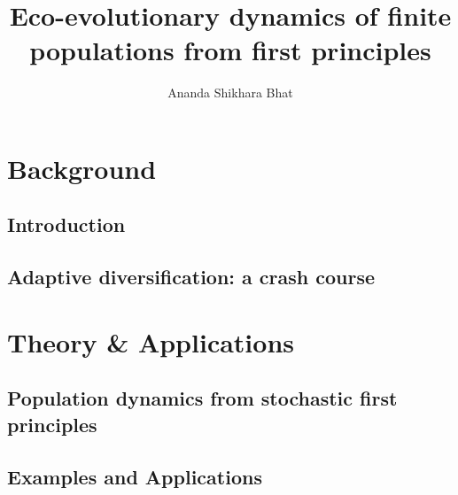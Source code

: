\documentclass[twoside, 12pt]{iiser-thesis}
\title{Eco-evolutionary dynamics of finite populations from first principles}
\author{Ananda Shikhara Bhat}
\begin{document}
\pagestyle{plain}
\thesisfront
\listoftables
\listoffigures

\part{Background}


\pagestyle{fancy}
\fancyhf{}
\fancyhead[LE,RO]{\thepage}
\fancyhead[RE]{\rule[-2ex]{0pt}{4ex}\footnotesize\itshape\nouppercase{\leftmark}}
\fancyhead[LO]{\rule[-2ex]{0pt}{4ex}\footnotesize\itshape\nouppercase{\rightmark}}
\setlength{\headheight}{18pt} %
\renewcommand{\headrulewidth}{0pt}

\renewcommand{\chaptermark}[1]{\markboth{\chaptername \ \thechapter \ :\ #1}{}}
\renewcommand{\sectionmark}[1]{\markright{\thesection. \ \ #1}{}}

\chapter{Introduction}

\chapter{Adaptive diversification: a crash course}\label{chap_AD}


\part{Theory \& Applications}
\chapter{Population dynamics from stochastic first principles}\label{chap_BD}

\chapter{Examples and Applications}\label{chap_examples}

% 
% 
\end{document}
